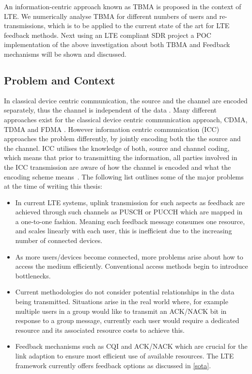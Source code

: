 \documentclass{article}
\begin{document}
An information-centric approach known as \ac{TBMA} is proposed in the context of LTE. We numerically analyse \ac{TBMA} for different numbers of users and re-transmissions, which is to be applied to the current state of the art for LTE feedback methods. Next using an LTE compliant SDR project \cite{srslte} a \ac{POC} implementation of the above investigation about both \ac{TBMA} and Feedback mechanisms will be shown and discussed. 


\subsection{Problem and Context}\label{prob_context}
In classical device centric communication, the source and the channel are encoded separately, thus the channel is independent of the data \cite{shannon_theory}. Many different approaches exist for the classical device centric communication approach, \ac{CDMA}, \ac{TDMA} and \ac{FDMA}
\cite{multiple_access_protocols}. However information centric communication (ICC) approaches the problem differently, by jointly encoding both the the source and the channel. ICC utilises the knowledge of both, source  and channel coding, which means that prior to transmitting the information, all parties involved in the ICC transmission are aware of how the channel is encoded and what the encoding scheme means~\cite{information_centric}. The following list outlines some of the major problems at the time of writing this thesis:
\begin{itemize}
  \item In current LTE systems, uplink transmission for such aspects as feedback are achieved through such channels as \ac{PUSCH} or \ac{PUCCH} which are mapped in a one-to-one fashion. Meaning each feedback message consumes one resource, and scales linearly with each user, this is inefficient due to the increasing number of connected devices. 
  \item As more users/devices become connected, more problems arise about how to access the medium efficiently. Conventional access methods begin to introduce bottlenecks.
  \item Current methodologies do not consider potential relationships in the data being transmitted. Situations arise in the real world where, for example multiple users in a group would like to transmit an \ac{ACK/NACK} bit in response to a group message, currently each user would require a dedicated resource and its associated resource costs to achieve this.
  \item Feedback mechanisms such as CQI and ACK/NACK which are crucial for the link adaption to ensure most efficient use of available resources. The LTE framework currently offers feedback options as discussed in \cref{sota}.
\end{itemize}
\end{document}
